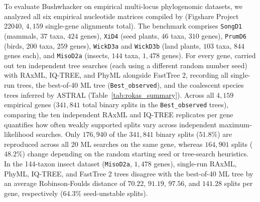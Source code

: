 \documentclass[11pt,a4paper]{article}
\begin{document}
To evaluate Bushwhacker on empirical multi-locus phylogenomic datasets, we analyzed all six empirical nucleotide matrices compiled by \citet{zhou2018evaluating} (Figshare Project 22040, $4,159$ single-gene alignments total). The benchmark comprises \texttt{SongD1} (mammals, $37$ taxa, $424$ genes), \texttt{XiD4} (seed plants, $46$ taxa, $310$ genes), \texttt{PrumD6} (birds, $200$ taxa, $259$ genes), \texttt{WickD3a} and \texttt{WickD3b} (land plants, $103$ taxa, $844$ genes each), and \texttt{MisoD2a} (insects, $144$ taxa, $1,478$ genes). For every gene, \citet{zhou2018evaluating} carried out ten independent tree searches (each using a different random number seed) with RAxML, IQ-TREE, and PhyML alongside FastTree 2, recording all single-run trees, the best-of-40 ML tree (\texttt{Best\_observed}), and the coalescent species trees inferred by ASTRAL \citep{zhang2018astral} (Table~\ref{tab:rokas_summary}). Across all $4,159$ empirical genes ($341,841$ total binary splits in the \texttt{Best\_observed} trees), comparing the ten independent RAxML and IQ-TREE replicates per gene quantifies how often weakly supported splits vary across independent maximum-likelihood searches. Only $176,940$ of the $341,841$ binary splits ($51.8\%$) are reproduced across all 20 ML searches on the same gene, whereas $164,901$ splits ($48.2\%$) change depending on the random starting seed or tree-search heuristics. In the 144-taxon insect dataset (\texttt{MisoD2a}, $1,478$ genes), single-run RAxML, PhyML, IQ-TREE, and FastTree 2 trees disagree with the best-of-40 ML tree by an average Robinson-Foulds distance of $70.22$, $91.19$, $97.56$, and $141.28$ splits per gene, respectively ($64.3\%$ seed-unstable splits).
\end{document}
